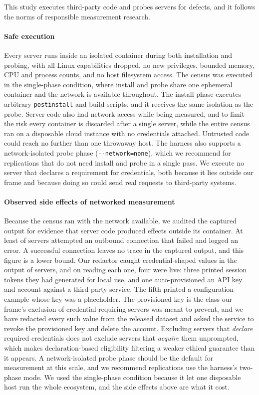 This study executes third-party code and probes servers for defects, and it follows
the norms of responsible measurement research.

\paragraph{Safe execution}
Every server runs inside an isolated container during both installation and probing,
with all Linux capabilities dropped, no new privileges, bounded memory, CPU and
process counts, and no host filesystem access. The census was executed in the
single-phase condition, where install and probe share one ephemeral container and the
network is available throughout. The install phase executes arbitrary
\texttt{postinstall} and build scripts, and it receives the same isolation as the
probe. Server code also had network access while being measured, and to limit the risk
every container is discarded after a single server, while the entire census ran on a
disposable cloud instance with no credentials attached. Untrusted code could reach no
further than one throwaway host. The harness also supports a network-isolated probe
phase (\texttt{-{}-network=none}), which we recommend for replications that do not
need install and probe in a single pass. We execute no server that declares a
requirement for credentials, both because it lies outside our frame and because doing
so could send real requests to third-party systems.

\paragraph{Observed side effects of networked measurement}
Because the census ran with the network available, we audited the captured output
for evidence that server code produced effects outside its container. At least \OutboundFailPct{} of servers attempted an
outbound connection that failed and logged an error. A successful connection leaves
no trace in the captured output, and this figure is a lower bound. Our redactor caught credential-shaped values in the output of
\NCredRedacted{} servers, and on reading each one, four were live: three printed
session tokens they had generated for local use, and one auto-provisioned an API key
and account against a third-party service. The fifth printed a configuration example
whose key was a placeholder. The provisioned key is the class our frame's exclusion of credential-requiring
servers was meant to prevent, and we have redacted every such value from the released
dataset and asked the service to revoke the provisioned key and delete the account.
Excluding servers that \emph{declare} required
credentials does not exclude servers that \emph{acquire} them unprompted, which makes
declaration-based eligibility filtering a weaker ethical guarantee than it
appears. A network-isolated probe phase should be the default for
measurement at this scale, and we recommend replications use the harness's
two-phase mode. We used the single-phase condition because it let one disposable host run the
whole ecosystem, and the side effects above are what it cost.

